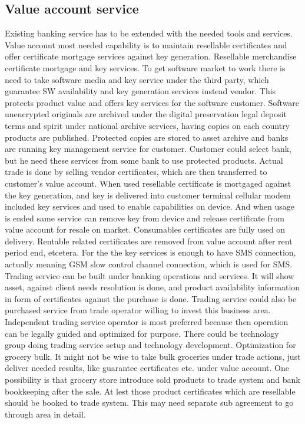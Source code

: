 \subsection{Value account service}
\label{value_account_service}
Existing banking service has to be extended with the needed tools and
services. Value account most needed capability is to maintain resellable
certificates and offer certificate mortgage services against key generation.
Resellable merchandise certificate mortgage and key services.
To get software market to work there is need to take software media and key
service under the third party, which guarantee SW availability and key
generation services instead vendor. This protects product value and offers key
services for the software customer. Software unencrypted originals are
archived under the digital preservation legal deposit\allowbreak\cite{
EULegalDepositScheme} terms and spirit under national archive services, having
copies on each country products are published. Protected copies are stored to
asset archive and banks are running key management service for customer.
Customer could select bank, but he need these services from some bank to use
protected products. Actual trade is done by selling vendor certificates, which
are then transferred to customer's value account. When used resellable
certificate is mortgaged against the key generation, and key is delivered into
customer terminal cellular modem included key services and used to enable
capabilities on device. And when usage is ended same service can remove key
from device and release certificate from value account for resale on market.
Consumables certificates are fully used on delivery. Rentable related
certificates are removed from value account after rent period end, etcetera.
For the the key services is enough to have SMS connection, actually meaning
GSM slow control channel connection, which is used for SMS.
Trading service can be built under banking operations and services. It will
show asset, against client needs resolution is done, and product availability
information in form of certificates against the purchase is done. Trading
service could also be purchased service from trade operator willing to invest
this business area. Independent trading service operator is most preferred
because then operation can be legally guided and optimized for purpose. There
could be technology group doing trading service setup and technology
development. Optimization for grocery bulk. It might not be wise to take bulk
groceries under trade actions, just deliver needed results, like guarantee
certificates etc. under value account. One possibility is that grocery store
introduce sold products to trade system and bank bookkeeping after the sale.
At lest those product certificates which are resellable should be booked to
trade system. This may need separate sub agreement to go through area in
detail.

